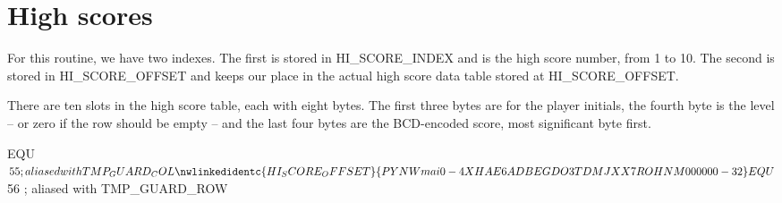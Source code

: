 \documentclass[10pt]{report}
\begin{document}
\chapter{High scores}

For this routine, we have two indexes. The first is stored in {\Tt{}HI{\_}SCORE{\_}INDEX\nwendquote} and is the high score
number, from 1 to 10. The second is stored in {\Tt{}HI{\_}SCORE{\_}OFFSET\nwendquote} and keeps our place in the actual
high score data table stored at {\Tt{}HI{\_}SCORE{\_}OFFSET\nwendquote}.

There are ten slots in the high score table, each with eight bytes. The first three bytes are
for the player initials, the fourth byte is the level -- or zero if the row should be empty -- and
the last four bytes are the BCD-encoded score, most significant byte first.

\nwenddocs{}\plusendmoddef\nwstartdeflinemarkup{}\nwenddeflinemarkup
{}      EQU     $55     ; aliased with TMP_GUARD_COL
\nwlinkedidentc{HI_SCORE_OFFSET}{PYNWmai0-4XHAE6ADBEGDO3TDMJXX7ROHNM000000-32}     EQU     $56     ; aliased with TMP_GUARD_ROW
\eatline
{}\nwendcode{}\nwdocspar
\end{document}
